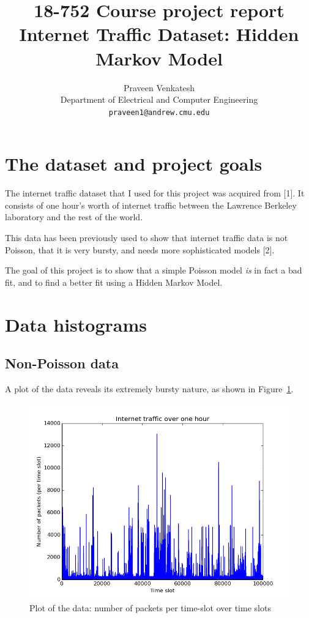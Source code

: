 \documentclass[11pt, twoside]{article}
\title{
	18-752 Course project report\\
	Internet Traffic Dataset: Hidden Markov Model
}
\date{}
\author{
	Praveen Venkatesh\\
	Department of Electrical and Computer Engineering\\
	\texttt{praveen1@andrew.cmu.edu}
}
\begin{document}
\maketitle

\section{The dataset and project goals}

The internet traffic dataset that I used for this project was acquired from [1]. It consists of one hour's worth of internet traffic between the Lawrence Berkeley laboratory and the rest of the world.

This data has been previously used to show that internet traffic data is not Poisson, that it is very bursty, and needs more sophisticated models [2].

The goal of this project is to show that a simple Poisson model \emph{is} in fact a bad fit, and to find a better fit using a Hidden Markov Model.

\section{Data histograms}

\subsection{Non-Poisson data}

A plot of the data reveals its extremely bursty nature, as shown in Figure~\ref{fig:data}.
\begin{figure}[h!]
	\centering
	\includegraphics[scale = 0.7]{data}
	\caption{Plot of the data: number of packets per time-slot over time slots}
	\label{fig:data}
\end{figure}
\end{document}
